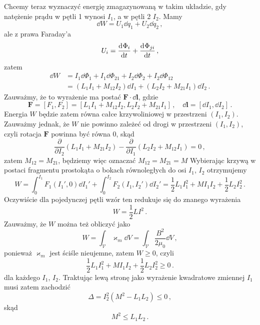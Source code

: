 \documentclass[../main.tex]{subfiles}
\begin{document}
Chcemy teraz wyznaczyć energię zmagazynowaną w takim układzie, gdy natężenie prądu w pętli 1 wynosi \(I_1\), a w pętli 2 \(I_2\). Mamy
\begin{equation*}
    \dd{W}=U_1\dd{q_1}+U_2\dd{q_2}\,,
\end{equation*}
ale z prawa Faraday'a
\begin{equation*}
    U_i=\dv[]{\Phi_i}{t}+\dv[]{\Phi_{ji}}{t}\,,
\end{equation*}
zatem
\begin{equation*}
\begin{split}
    \dd{W}&=I_1\dd{\Phi_1}+I_1\dd{\Phi_{21}}+I_2\dd{\Phi_2}+I_2\dd{\Phi_{12}}\\
    &=(L_1I_1+M_{12}I_2)\dd{I_1}+(L_2I_2+M_{21}I_1)\dd{I_2}\,.
\end{split}
\end{equation*}
Zauważmy, że to wyrażenie ma postać \(\mathbf{F}\cdot\dd{\mathbf{l}}\), gdzie
\begin{equation*}
    \mathbf{F}=[F_1,F_2]=[L_1I_1+M_{12}I_2,L_2I_2+M_{21}I_1]\,,\quad\dd{\mathbf{l}}=[\dd{I_1},\dd{I_2}]\,.
\end{equation*}
Energia \(W\) będzie zatem równa całce krzywoliniowej w przestrzeni \((I_1,I_2)\). Zauważmy jednak, że \(W\) nie powinno zależeć od drogi w przestrzeni \((I_1,I_2)\), czyli rotacja \(\mathbf{F}\) powinna być równa 0, skąd
\begin{equation*}
    \frac{\partial}{\partial I_2}(L_1I_1+M_{21}I_2)-\frac{\partial}{\partial I_1}(L_2I_2+M_{12}I_1)=0\,,
\end{equation*}
zatem \(M_{12}=M_{21}\), będziemy więc oznaczać \(M_{12}=M_{21}=M\) Wybierając krzywą w postaci fragmentu prostokąta o bokach równoległych do osi \(I_1\), \(I_2\) otrzymujemy
\begin{equation*}
    W=\int_0^{I_1} F_1(I_1',0)\dd{I_1'}+\int_0^{I_2}F_2(I_1,I_2')\dd{I_2'}=\frac{1}{2}L_1I_1^2+MI_1I_2+\frac{1}{2}L_2I_2^2\,.
\end{equation*}
Oczywiście dla pojedynczej pętli wzór ten redukuje się do znanego wyrażenia
\begin{equation*}
    W=\frac{1}{2}LI^2\,.
\end{equation*}
Zauważmy, że \(W\) można też obliczyć jako
\begin{equation*}
    W=\int_\mathcal{V}\varkappa_m\dd{V}=\int_\mathcal{V}\frac{B^2}{2\mu_0}\dd{V}\,,
\end{equation*}
ponieważ \(\varkappa_m\) jest ściśle nieujemne, zatem \(W\geq 0\), czyli
\begin{equation*}
    \frac{1}{2}L_1I_1^2+MI_1I_2+\frac{1}{2}L_2I_2^2\geq 0\,.
\end{equation*}
dla każdego \(I_1\), \(I_2\). Traktując lewą stronę jako wyrażenie kwadratowe zmiennej \(I_1\) musi zatem zachodzić
\begin{equation*}
    \Delta=I_2^2(M^2-L_1L_2)\leq 0\,,
\end{equation*}
skąd
\begin{equation*}
    M^2\leq L_1L_2\,.
\end{equation*}
\end{document}
